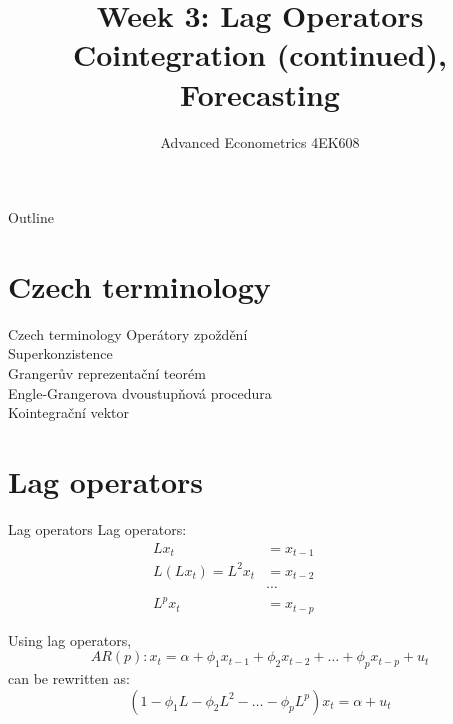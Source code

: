 \documentclass{beamer}
\title[Week1]{Week 3:  Lag Operators \\ Cointegration (continued), Forecasting}
\author{Advanced Econometrics 4EK608}
\institute{Vysoká škola ekonomická v Praze}
\date{}
\begin{document}
 
\begin{frame}
  \titlepage
\end{frame}

\begin{frame}{Outline}
  \tableofcontents
\end{frame}

%
\section{Czech terminology}

\begin{frame}{Czech terminology}
Operátory zpoždění
\\ Superkonzistence
\\ Grangerův reprezentační teorém
\\ Engle-Grangerova dvoustupňová procedura
\\ Kointegrační vektor 
\end{frame}

\section{Lag operators}

\begin{frame}{Lag operators}
Lag operators:
\begin{align*}
Lx_t &= x_{t-1} \\
L(Lx_t)=L^2x_t &= x_{t-2} ~~~~~~~~~~~~~~~~~\\
&\cdots \\
L^p x_t &= x_{t-p} 
\end{align*}

Using lag operators,
$$ AR(p):  x_t = \alpha + \phi_1 x_{t-1} + \phi_2 x_{t-2} +\dots + \phi_p
  x_{t-p}+u_t$$
can be rewritten as: 
$$(1-\phi_1 L - \phi_2 L^2 - \dots - \phi_p L^p)x_t = \alpha + u_t $$

\end{frame}

\end{document}
